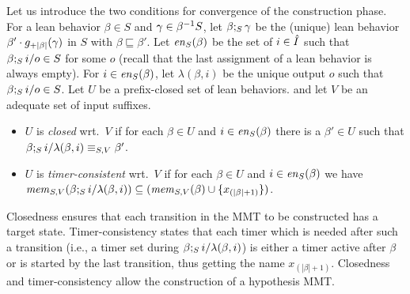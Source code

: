 Let us introduce the two conditions for convergence of the construction phase.
For a lean behavior $\beta\in S$ and $\gamma \in \suffixbehs{S}{\beta}$, let
$\beta\compose{S}\gamma$ be the (unique) lean behavior $\beta'\cdot\suffmap{|\beta|}(\gamma)$ in $S$ with $\beta \sqsubseteq \beta'$.
Let $\feasibleinputs{\beta}{S}$ be the set of $i \in \extinputs$ such that
$\beta \compose{S} \simpleutlabel{i}{o} \in S$ for some $o$ (recall that the
last assignment of a lean behavior is always empty).
For $i \in \feasibleinputs{\beta}{S}$, let $\lambda(\beta,i)$ be the unique
output $o$ such that $\beta \compose{S} \simpleutlabel{i}{o} \in S$.
Let $U$ be a prefix-closed set of lean behaviors.
and let $V$ be an adequate set of input suffixes.
\begin{itemize}
\item
$U$ is {\em closed} wrt.\ $V$ if 
  for each $\beta \in U$ and
  $i \in \feasibleinputs{\beta}{S}$
  there is a $\beta' \in U$ such that
  $\beta\compose{S}\simpleutlabel{i}{\lambda(\beta,i)} \equiv_{S,V} \beta'$.
\item
$U$ is {\em timer-consistent} wrt.\ $V$ if 
  for each $\beta \in U$ and
  $i \in \feasibleinputs{\beta}{S}$
  we have
  $\apprgetmemorable{S}{\beta\compose{S}\simpleutlabel{i}{\lambda(\beta,i)}}{V} \subseteq
  (\apprgetmemorable{S}{\beta}{V} \cup \set{x_{(|\beta|+1)}})$.
\end{itemize}
Closedness ensures that each transition in the MMT to be constructed has a target state. 
Timer-consistency states that each timer which is needed after such
a transition (i.e., a timer set during $\beta\compose{S}\simpleutlabel{i}{\lambda(\beta,i)}$)
is either a timer active after $\beta$ or is started by the last transition, thus
getting the name $x_{(|\beta|+1)}$.
Closedness and timer-consistency allow the construction of a hypothesis MMT.

